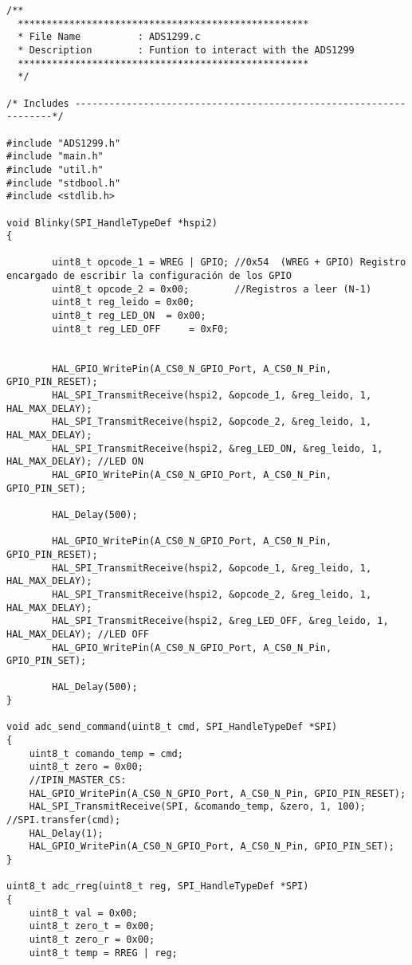 \begin{lstlisting}[label=algoritmo:STM32F4:ADS1299.c,style = STM-code,frame=single,caption=STM32F4:ADS1299.c]
/**
  ***************************************************
  * File Name          : ADS1299.c
  * Description        : Funtion to interact with the ADS1299
  ***************************************************
  */

/* Includes ------------------------------------------------------------------*/

#include "ADS1299.h"
#include "main.h"		
#include "util.h"
#include "stdbool.h"
#include <stdlib.h>

void Blinky(SPI_HandleTypeDef *hspi2)
{
	
		uint8_t opcode_1 = WREG | GPIO; //0x54  (WREG + GPIO) Registro encargado de escribir la configuración de los GPIO
		uint8_t opcode_2 = 0x00;		//Registros a leer (N-1)
		uint8_t reg_leido = 0x00;
		uint8_t reg_LED_ON 	= 0x00;
		uint8_t reg_LED_OFF 	= 0xF0;
		
	
		HAL_GPIO_WritePin(A_CS0_N_GPIO_Port, A_CS0_N_Pin, GPIO_PIN_RESET);
		HAL_SPI_TransmitReceive(hspi2, &opcode_1, &reg_leido, 1, HAL_MAX_DELAY);
		HAL_SPI_TransmitReceive(hspi2, &opcode_2, &reg_leido, 1, HAL_MAX_DELAY);					
		HAL_SPI_TransmitReceive(hspi2, &reg_LED_ON, &reg_leido, 1, HAL_MAX_DELAY); //LED ON
		HAL_GPIO_WritePin(A_CS0_N_GPIO_Port, A_CS0_N_Pin, GPIO_PIN_SET);
	
		HAL_Delay(500);
	
		HAL_GPIO_WritePin(A_CS0_N_GPIO_Port, A_CS0_N_Pin, GPIO_PIN_RESET);
		HAL_SPI_TransmitReceive(hspi2, &opcode_1, &reg_leido, 1, HAL_MAX_DELAY);
		HAL_SPI_TransmitReceive(hspi2, &opcode_2, &reg_leido, 1, HAL_MAX_DELAY);					
		HAL_SPI_TransmitReceive(hspi2, &reg_LED_OFF, &reg_leido, 1, HAL_MAX_DELAY); //LED OFF
		HAL_GPIO_WritePin(A_CS0_N_GPIO_Port, A_CS0_N_Pin, GPIO_PIN_SET);
		
		HAL_Delay(500);
}

void adc_send_command(uint8_t cmd, SPI_HandleTypeDef *SPI)
{
	uint8_t comando_temp = cmd;
	uint8_t zero = 0x00;
	//IPIN_MASTER_CS:
	HAL_GPIO_WritePin(A_CS0_N_GPIO_Port, A_CS0_N_Pin, GPIO_PIN_RESET);
	HAL_SPI_TransmitReceive(SPI, &comando_temp, &zero, 1, 100); //SPI.transfer(cmd);
	HAL_Delay(1);
	HAL_GPIO_WritePin(A_CS0_N_GPIO_Port, A_CS0_N_Pin, GPIO_PIN_SET);
}

uint8_t adc_rreg(uint8_t reg, SPI_HandleTypeDef *SPI)
{
	uint8_t val = 0x00;
	uint8_t zero_t = 0x00;
	uint8_t zero_r = 0x00;
	uint8_t temp = RREG | reg;
	

\end{lstlisting}
